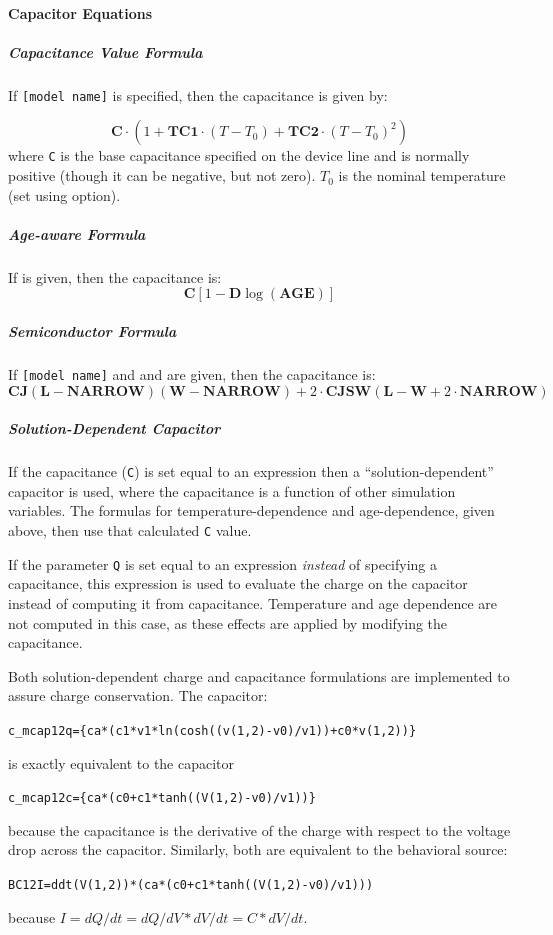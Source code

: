 

\paragraph{Capacitor Equations}

\subparagraph{Capacitance Value Formula}
If \texttt{[model name]} is specified, then the capacitance is given by:

\[
 \mathbf{C} \cdot (1 + \mathbf{TC1} \cdot (T - T_0) +
\mathbf{TC2} \cdot (T - T_0)^2)
\]
where \texttt{C} is the base capacitance specified on the device line
and is normally positive (though it can be negative, but not zero).
$T_0$ is the nominal temperature (set using  option).

\subparagraph{Age-aware Formula}
If  is given, then the capacitance is:
\[\mathbf{C}[1 - \mathbf{D} \log(\mathbf{AGE})]\]

\subparagraph{Semiconductor Formula}
If \texttt{[model name]} and  and  are given, then the capacitance is:
\[
\mathbf{CJ}(\mathbf{L} - \mathbf{NARROW})(\mathbf{W} - \mathbf{NARROW}) + 2
\cdot \mathbf{CJSW}(\mathbf{L} - \mathbf{W} + 2 \cdot \mathbf{NARROW})
\]

\subparagraph{Solution-Dependent Capacitor}
If the capacitance (\texttt{C}) is set equal to an expression then a
``solution-dependent'' capacitor is used, where the capacitance is
a function of other simulation variables.  The formulas for
temperature-dependence and age-dependence, given above, then use that
calculated \texttt{C} value.

If the parameter \texttt{Q} is set equal to an expression {\em
  instead} of specifying a capacitance, this expression is used to
evaluate the charge on the capacitor instead of computing it from
capacitance.  Temperature and age dependence are not computed in this
case, as these effects are applied by modifying the capacitance.

Both solution-dependent charge and capacitance formulations are
implemented to assure charge conservation.  The capacitor:
\begin{alltt}
  c\_mcap 1 2 q=\{ca*(c1*v1*ln(cosh((v(1,2)-v0)/v1))+c0*v(1,2))\}
\end{alltt}
is exactly equivalent to the capacitor
\begin{alltt}
  c\_mcap 1 2 c=\{ca*(c0+c1*tanh((V(1,2)-v0)/v1))\}
\end{alltt}
because the capacitance is the derivative of the charge with respect
to the voltage drop across the capacitor.  Similarly, both are
equivalent to the behavioral source:
\begin{alltt}
  BC 1 2 I={ddt(V(1,2))*(ca*(c0+c1*tanh((V(1,2)-v0)/v1)))}
\end{alltt}
because $I=dQ/dt=dQ/dV*dV/dt=C*dV/dt$.

